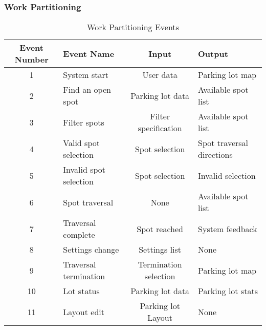 \documentclass[12pt,letterpaper]{article}
\begin{document}
\subsubsection{Work Partitioning}
\begin{table}[h!]
\caption{Work Partitioning Events}
    \centering
    \begin{tabular}{|c|p{3.5cm}|c|p{3.5cm}|}
    \hline
    \textbf{Event Number} & \centering\textbf{Event Name} & \textbf{Input} & \textbf{Output} \\
    \hline
    1 & System start & User data & Parking lot map\\
    \hline
    2 & Find an open spot & Parking lot data & Available spot list\\
    \hline
    3 & Filter spots & Filter specification & Available spot list\\
    \hline
    4 & Valid spot selection & Spot selection & Spot traversal directions\\
    \hline
    5 & Invalid spot selection & Spot selection & Invalid selection\\
    \hline
    6 & Spot traversal & None & Available spot list\\
    \hline
    7 & Traversal complete & Spot reached & System feedback\\
    \hline
    8 & Settings change & Settings list & None\\
    \hline
    9 & Traversal termination & Termination selection & Parking lot map\\
    \hline
    10 & Lot status & Parking lot data & Parking lot stats\\
    \hline
    11 & Layout edit & Parking lot Layout & None\\
    \hline
    \end{tabular}
\end{table}
\end{document}
